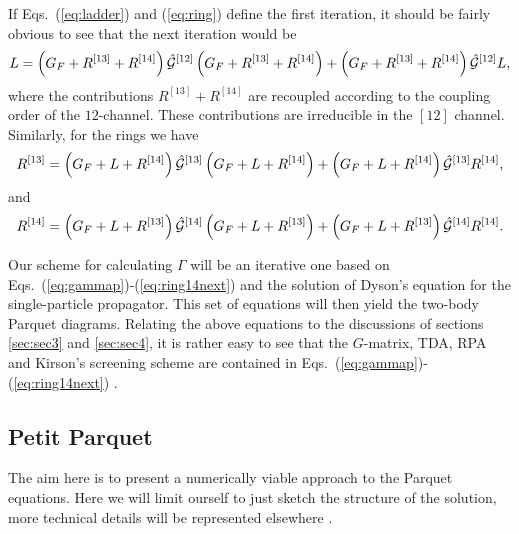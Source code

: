 If Eqs.\ (\ref{eq:ladder}) and (\ref{eq:ring}) define the first iteration,
it should be fairly obvious to see that the next iteration would be
\begin{equation}
    L=\left(G_F+R^{[13]}+R^{[14]}\right)\hat{{\cal G}}^{[12]}\left(G_F+R^{[13]}+R^{[14]}\right)
      +\left(G_F+R^{[13]}+R^{[14]}\right)\hat{{\cal G}}^{[12]}L,
    \label{eq:laddernext}
\end{equation}
where the contributions $R^{[13]}+R^{[14]} $ are recoupled according to the coupling order
of the $12$-channel. These contributions are irreducible in the $[12]$ channel.
Similarly, for the rings we have
\begin{equation}
    R^{[13]}=\left(G_F+L+R^{[14]}\right)\hat{{\cal G}}^{[13]}
             \left(G_F+L+R^{[14]}\right) + 
             \left(G_F+L+R^{[14]}\right)\hat{{\cal G}}^{[13]}R^{[14]},
    \label{eq:ring13next}
\end{equation}
and
\begin{equation}
    R^{[14]}=\left(G_F+L+R^{[13]}\right)\hat{{\cal G}}^{[14]}
             \left(G_F+L+R^{[13]}\right) + 
             \left(G_F+L+R^{[13]}\right)\hat{{\cal G}}^{[14]}R^{[14]}.
    \label{eq:ring14next}
\end{equation}


Our scheme for calculating $\Gamma$ will be an iterative one based on 
Eqs.\ (\ref{eq:gammap})-(\ref{eq:ring14next}) 
and the solution of Dyson's equation
for the single-particle propagator. This set of equations will then yield
the two-body Parquet diagrams. 
Relating the above equations to the discussions of sections \ref{sec:sec3}
and \ref{sec:sec4}, it is rather easy to see 
that the $G$-matrix, TDA, RPA and Kirson's
screening scheme are contained in Eqs.\ 
(\ref{eq:gammap})-(\ref{eq:ring14next}) .



\subsection{Petit Parquet}


The aim here is to present a numerically viable approach
to the Parquet equations.
Here
we will limit ourself to just sketch 
the structure of the solution, more technical details 
will be represented elsewhere \cite{mhj99}.

